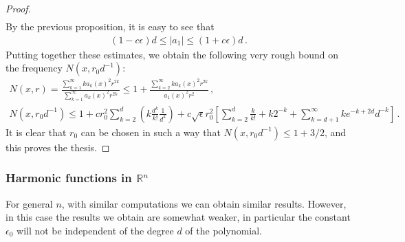 \documentclass[11pt]{article}
\begin{document}
\begin{proof}
\begin{gather}
\end{gather}
 By the previous proposition, it is easy to see that
 \begin{gather}
  (1-c\epsilon)d \leq {\left|{a_1}\right|}\leq (1+c\epsilon) d\, .
 \end{gather}
Putting together these estimates, we obtain the following very rough bound on the frequency $ N(x,r_0 d^{-1})$:
\begin{gather}
  N(x,r)= \frac{\sum_{k=1}^\infty k a_k(x)^2 r^{2k}}{\sum_{k=1}^\infty a_k(x)^2 r^{2k}}\leq 1+\frac{\sum_{k=2}^\infty k a_k(x)^2 r^{2k}}{a_1(x)^2 r^2 }\, ,\\
  N(x,r_0 d^{-1})\leq 1+cr_0^2 \sum_{k=2}^d{\left({k \frac{d^k}{k!} \frac 1 {d^k}}\right)} + c\sqrt \epsilon r_0^2 {\left[{\sum_{k=2}^d \frac k {k!} + k2^{-k}  + \sum_{k=d+1}^\infty ke^{-k+2d} d^{-k} }\right]}\, .
\end{gather}
It is clear that $r_0$ can be chosen in such a way that $ N{\left({x,r_0d^{-1}}\right)}\leq 1+3/2$, and this proves the thesis.

\end{proof}

\subsubsection{Harmonic functions in ${\mathbb{R}}^n$} For general $n$, with similar computations we can obtain similar results. However, in this case the results we obtain are somewhat weaker, in particular the constant $\epsilon_0$ will not be independent of the degree $d$ of the polynomial.
\end{document}
